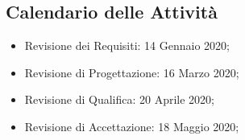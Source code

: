 		\subsection{Calendario delle Attività}
		\begin{itemize}
			\item Revisione dei Requisiti: 14 Gennaio 2020;
			\item Revisione di Progettazione: 16 Marzo 2020;
			\item Revisione di Qualifica: 20 Aprile 2020;
			\item Revisione di Accettazione: 18 Maggio 2020;			
		\end{itemize}
